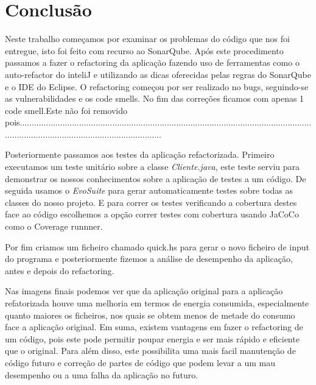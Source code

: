 \vspace{1cm}
\section{Conclusão}
\hfill\newline
\par Neste trabalho começamos por examinar os problemas do código que nos foi entregue, isto foi feito com recurso ao SonarQube. Após este procedimento passamos a fazer o refactoring da aplicação fazendo uso de ferramentas como o auto-refactor do inteliJ e utilizando as dicas oferecidas pelas regras do SonarQube e o IDE do Eclipse. O refactoring começou por ser realizado no bugs, seguindo-se as vulnerabilidades e os code smells. No fim das correções ficamos com apenas 1 code smell.Este não foi removido pois............................................................................................................................................................................................. \newline
\par Posteriormente passamos aos testes da aplicação refactorizada. Primeiro executamos um teste unitário sobre a classe \textit{Cliente.java}, este teste serviu para demonstrar os nossos conhecimentos sobre a aplicação de testes a um código. De seguida usamos o \textit{EvoSuite} para gerar automaticamente testes sobre todas as classes do nosso projeto. E para correr os testes verificando a cobertura destes face ao código escolhemos a opção correr testes com cobertura usando JaCoCo como o Coverage runnner.\newline
\par Por fim criamos um ficheiro chamado quick.hs para gerar o novo ficheiro de input do programa e posteriormente fizemos a análise de desempenho da aplicação, antes e depois do refactoring.\newline
\par Nas imagens finais podemos ver que da aplicação original para a aplicação refatorizada houve uma melhoria em termos de energia consumida, especialmente quanto maiores os ficheiros, nos quais se obtem menos de metade do consumo face a aplicação original.\newline
Em suma, existem vantagens em fazer o refactoring de um código, pois este pode permitir poupar energia e ser mais rápido e eficiente que o original. Para além disso, este possibilita uma mais facil manutenção de código futuro e correção de partes de código que podem levar a um mau desempenho ou a uma falha da aplicação no futuro.


